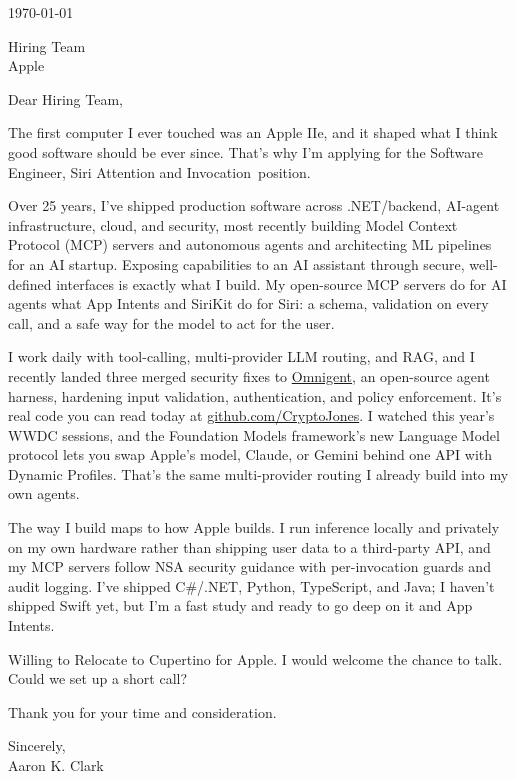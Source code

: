 \documentclass{resume}
\def\company{Apple}
\def\role{Software Engineer, Siri Attention and Invocation}
\def\manager{Hiring Team}          %
\begin{document}
\vspace{0.5em}
\today

\bigskip
\noindent \manager \\
\company

\bigskip
\noindent Dear \manager,

The first computer I ever touched was an Apple IIe, and it shaped what I think good software should be ever since. That's why I'm applying for the \role\ position.

Over 25 years, I've shipped production software across .NET/backend, AI-agent infrastructure, cloud, and security, most recently building Model Context Protocol (MCP) servers and autonomous agents and architecting ML pipelines for an AI startup. Exposing capabilities to an AI assistant through secure, well-defined interfaces is exactly what I build. My open-source MCP servers do for AI agents what App Intents and SiriKit do for Siri: a schema, validation on every call, and a safe way for the model to act for the user.

I work daily with tool-calling, multi-provider LLM routing, and RAG, and I recently landed three merged security fixes to \href{https://github.com/omnigent-ai/omnigent}{Omnigent}, an open-source agent harness, hardening input validation, authentication, and policy enforcement. It's real code you can read today at \href{https://github.com/CryptoJones}{github.com/CryptoJones}. I watched this year's WWDC sessions, and the Foundation Models framework's new Language Model protocol lets you swap Apple's model, Claude, or Gemini behind one API with Dynamic Profiles. That's the same multi-provider routing I already build into my own agents.

The way I build maps to how Apple builds. I run inference locally and privately on my own hardware rather than shipping user data to a third-party API, and my MCP servers follow NSA security guidance with per-invocation guards and audit logging. I've shipped C\#/.NET, Python, TypeScript, and Java; I haven't shipped Swift yet, but I'm a fast study and ready to go deep on it and App Intents.

Willing to Relocate to Cupertino for Apple. I would welcome the chance to talk. Could we set up a short call?

\bigskip
\noindent Thank you for your time and consideration.

\bigskip
\noindent Sincerely, \\[1em]
Aaron K. Clark
\end{document}
